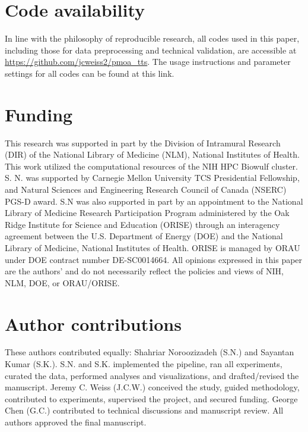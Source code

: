 \documentclass[pdflatex,sn-mathphys-num]{sn-jnl}%
\theoremstyle{thmstyleone}%
\theoremstyle{thmstyletwo}%
\theoremstyle{thmstylethree}%
\begin{document}

\section*{Code availability}\label{sec:data_availability}
In line with the philosophy of reproducible research, all codes used in this paper, including those for data preprocessing and technical validation, are accessible at \url{https://github.com/jcweiss2/pmoa_tts}. The usage instructions and parameter settings for all codes can be found at this link.

\section*{Funding}

This research was supported in part by the Division of Intramural Research (DIR) of the National Library of Medicine (NLM), National Institutes of Health. This work utilized the computational resources of the NIH HPC Biowulf cluster. S. N. was supported by Carnegie Mellon University TCS Presidential Fellowship, and Natural Sciences and Engineering Research Council of Canada (NSERC) PGS-D award. S.N was also supported in part by an appointment to the National Library of Medicine Research Participation Program administered by the Oak Ridge Institute for Science and Education (ORISE) through an interagency agreement between the U.S. Department of Energy (DOE) and the National Library of Medicine, National Institutes of Health. ORISE is managed by ORAU under DOE contract number DE-SC0014664. All opinions expressed in this paper are the authors’ and do not necessarily reflect the policies and views of NIH, NLM, DOE, or ORAU/ORISE.


\section*{Author contributions}

These authors contributed equally: Shahriar Noroozizadeh (S.N.) and Sayantan Kumar (S.K.). S.N. and S.K. implemented the pipeline, ran all experiments, curated the data, performed analyses and visualizations, and drafted/revised the manuscript. Jeremy C. Weiss (J.C.W.) conceived the study, guided methodology, contributed to experiments, supervised the project, and secured funding. George Chen (G.C.) contributed to technical discussions and manuscript review. All authors approved the final manuscript.



\clearpage
\appendix

\end{document}
